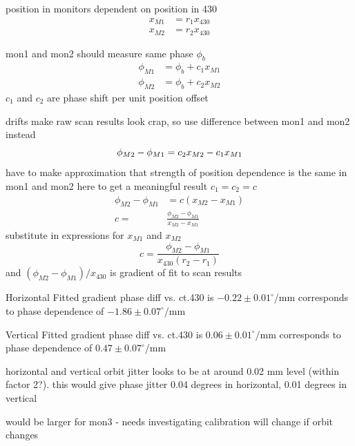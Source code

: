 position in monitors dependent on position in 430
\begin{align}
x_{M1} &= r_{1}x_{430} \\
x_{M2} &= r_{2}x_{430}
\end{align}

mon1 and mon2 should measure same phase \(\phi_b\)
\begin{align}
\phi_{M1} &= \phi_b + c_1x_{M1} \\
\phi_{M2} &= \phi_b + c_2x_{M2}
\end{align}
\(c_1\) and \(c_2\) are phase shift per unit position offset

drifts make raw scan results look crap, so use difference between mon1 and mon2 instead
\begin{equation}
\phi_{M2}-\phi_{M1} = c_2x_{M2} - c_1x_{M1} \\
\end{equation}
have to make approximation that strength of position dependence is the same in mon1 and mon2 here to get a meaningful result \(c_1 = c_2 = c\)
\begin{align}
\phi_{M2}-\phi_{M1} &= c(x_{M2}-x_{M1}) \\
c = &\frac{\phi_{M2}-\phi_{M1}}{x_{M2}-x_{M1}} 
\end{align}
substitute in expressions for \(x_{M1}\) and \(x_{M2}\)
\begin{equation}
c = \frac{\phi_{M2}-\phi_{M1}}{x_{430}(r_2-r_1)}
\end{equation}
and \((\phi_{M2}-\phi_{M1})/x_{430}\) is gradient of fit to scan results

Horizontal
Fitted gradient phase diff vs. ct.430 is \(-0.22\pm0.01^\circ\)/mm
corresponds to phase dependence of \(-1.86\pm0.07^\circ\)/mm

Vertical
Fitted gradient phase diff vs. ct.430 is \(0.06\pm0.01^\circ\)/mm
corresponds to phase dependence of \(0.47\pm0.07^\circ\)/mm

horizontal and vertical orbit jitter looks to be at around 0.02 mm level (within factor 2?). this would give phase jitter 0.04 degrees in horizontal, 0.01 degrees in vertical

would be larger for mon3 - needs investigating
calibration will change if orbit changes

